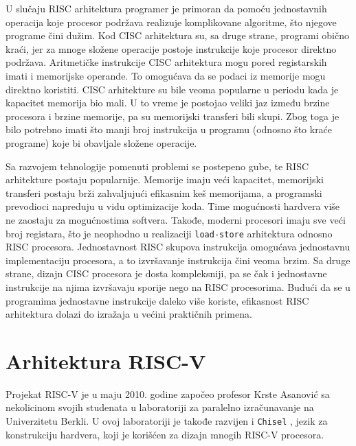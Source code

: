 \documentclass[12pt,oneside]{memoir}
\begin{document}
U slučaju RISC arhitektura programer je primoran da pomoću jednostavnih operacija koje procesor podržava realizuje komplikovane algoritme, što njegove programe čini dužim. Kod CISC arhitektura su, sa druge strane, programi obično kraći, jer za mnoge složene operacije postoje instrukcije koje procesor direktno podržava. Aritmetičke instrukcije CISC arhitektura mogu pored registarskih imati i memorijske operande. To omogućava da se podaci iz memorije mogu direktno koristiti. CISC arhitekture su bile veoma popularne u periodu kada je kapacitet memorija bio mali. U to vreme je postojao veliki jaz između brzine procesora i brzine memorije, pa su memorijski transferi bili skupi. Zbog toga je bilo potrebno imati što manji broj instrukcija u programu (odnosno što kraće programe) koje bi obavljale složene operacije. 

Sa razvojem tehnologije pomenuti problemi se postepeno gube, te RISC arhitekture postaju popularnije. Memorije imaju veći kapacitet, memorijski transferi postaju brži zahvaljujući efikasnim keš memorijama, a programski prevodioci napreduju u vidu optimizacije koda. Time mogućnosti hardvera više ne zaostaju za mogućnostima softvera. Takođe, moderni procesori imaju sve veći broj registara, što je neophodno u realizaciji \texttt{load-store} arhitektura odnosno RISC procesora. Jednostavnost RISC skupova instrukcija omogućava jednostavnu implementaciju procesora, a to izvršavanje instrukcija čini veoma brzim. Sa druge strane, dizajn CISC procesora je dosta kompleksniji, pa se čak i jednostavne instrukcije na njima izvršavaju sporije nego na RISC procesorima. Budući da se u programima jednostavne instrukcije daleko više koriste, efikasnost RISC arhitektura dolazi do izražaja u većini praktičnih primena.  

\section{Arhitektura RISC-V}
 
Projekat RISC-V je u maju 2010. godine započeo profesor Krste Asanović sa nekolicinom svojih studenata u laboratoriji za paralelno izračunavanje na Univerzitetu Berkli. U ovoj laboratoriji je takođe razvijen i \texttt{Chisel} \cite{chisel}, jezik za konstrukciju hardvera, koji je korišćen za dizajn mnogih RISC-V procesora. 
\end{document}
